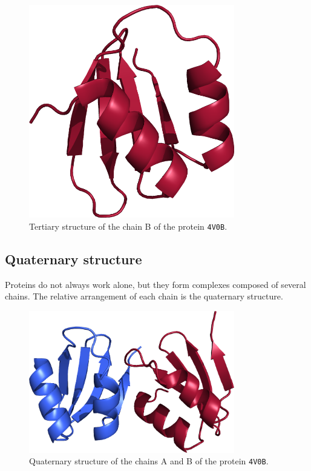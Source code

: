 \begin{figure}[htb]
\centering
\includegraphics[width=0.8\textwidth]{bioinfo/figures/tertiary}
\caption{Tertiary structure of the chain B of the protein \texttt{4V0B}.}\label{fig:tertiary}
\end{figure}

\subsection{Quaternary structure}
Proteins do not always work alone, but they form complexes composed of several chains.
The relative arrangement of each chain is the quaternary structure.

\begin{figure}[htb]
\centering
\includegraphics[width=0.8\textwidth]{bioinfo/figures/quaternary}
\caption{Quaternary structure of the chains A and B of the protein \texttt{4V0B}.}\label{fig:quaternary}
\end{figure}

